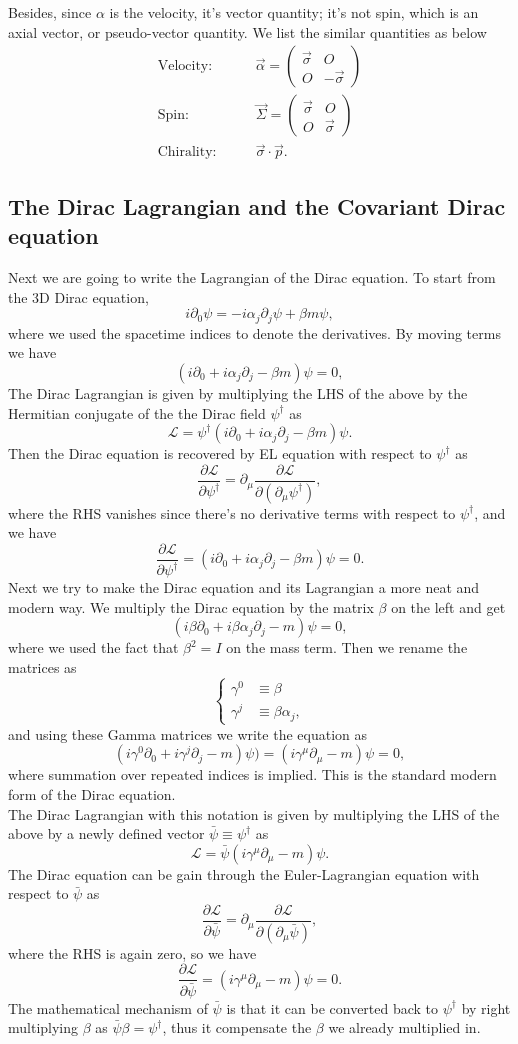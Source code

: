 \documentclass{article}
\newcommand{\be}{\begin{equation}}
\newcommand{\ee}{\end{equation}}
\newcommand{\ba}{\begin{array}}
\newcommand{\ea}{\end{array}}
\newcommand{\p}{\partial}
\renewcommand{\1}{\left}
\renewcommand{\2}{\right}
\newcommand{\ma}{\mathcal}
\newcommand{\m}{\mu}
\newcommand{\al}{\alpha}
\newcommand{\bet}{\beta}
\newcommand{\sig}{\sigma}
\begin{document}
Besides, since $\al$ is the velocity, it's vector quantity; it's not spin, which is an axial vector, or pseudo-vector quantity. We list the similar quantities as below
\be\begin{split}
\text{Velocity:}&\quad\quad \vec\al=\1(\ba{cc}\vec\sig&O\\O&-\vec\sig\ea\2)\\
\text{Spin:}&\quad\quad \vec\Sigma=\1(\ba{cc}\vec\sig&O\\O&\vec\sig\ea\2)\\
\text{Chirality:}&\quad\quad \vec\sig\cdot\vec p.
\end{split}\ee

\subsection{The Dirac Lagrangian and the Covariant Dirac equation}
Next we are going to write the Lagrangian of the Dirac equation. To start from the 3D Dirac equation,
\be
i\p_0\psi=-i\al_j\p_j\psi+\bet m\psi,
\ee
where we used the spacetime indices to denote the derivatives. By moving terms we have
\be
(i\p_0+i\al_j\p_j-\bet m)\psi=0,
\ee
The Dirac Lagrangian is given by multiplying the LHS of the above by the Hermitian conjugate of the  the Dirac field $\psi^\dag$ as
\be
\ma L=\psi^\dag(i\p_0+i\al_j\p_j-\bet m)\psi.
\ee
Then the Dirac equation is recovered by EL equation with respect to $\psi^\dag$ as 
\be
\frac{\p\ma L}{\p\psi^\dag}=\p_\m\frac{\p\ma L}{\p(\p_\m\psi^\dag)},
\ee
where the RHS vanishes since there's no derivative terms with respect to $\psi^\dag$, and we have
\be
\frac{\p\ma L}{\p\psi^\dag}=(i\p_0+i\al_j\p_j-\bet m)\psi=0.
\ee
Next we try to make the Dirac equation and its Lagrangian a more neat and modern way. We multiply the Dirac equation by the matrix $\bet$ on the left and get
\be
(i\bet\p_0+i\bet\al_j\p_j- m)\psi=0,
\ee
where we used the fact that $\bet^2=I$ on the mass term.
Then we rename the matrices as
\be\1\{\begin{split}
\gamma^0&\equiv\bet\\
\gamma^j&\equiv\bet\al_j,
\end{split}\2.\ee
and using these Gamma matrices we write the equation as
\be
(i\gamma^0\p_0+i\gamma^j\p_j-m)\psi)=(i\gamma^\m\p_\m-m)\psi= 0,
\ee
where summation over repeated indices is implied. This is the standard modern form of the Dirac equation.\\
The Dirac Lagrangian with this notation is given by multiplying the LHS of the above by a newly defined vector $\bar\psi\equiv\psi^\dag$ as
\be
\ma L=\bar\psi (i\gamma^\m\p_\m-m)\psi.
\ee
The Dirac equation can be gain through the Euler-Lagrangian equation with respect to $\bar\psi$ as
\be
\frac{\p\ma L}{\p\bar\psi}=\p_\m\frac{\p\ma L}{\p(\p_\m\bar\psi)},
\ee
where the RHS is again zero, so we have
\be
\frac{\p\ma L}{\p\bar\psi}=(i\gamma^\m\p_\m-m)\psi=0.
\ee
The mathematical mechanism of $\bar\psi$ is that it can be converted back to $\psi^\dag$ by right multiplying $\bet$ as $\bar\psi\bet=\psi^\dag$, thus it compensate the $\bet$ we already multiplied in.
\end{document}
